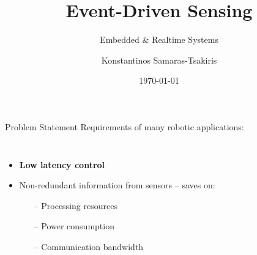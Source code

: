 \documentclass[11pt,center]{beamer}
\title{\huge{Event-Driven Sensing}}
\subtitle{Embedded \& Realtime Systems}
\author{Konstantinos Samaras-Tsakiris}
\date{\today}
\begin{document}
	\begin{frame}%
		\titlepage
	\end{frame}

	\begin{frame}{Problem Statement}
		Requirements of many robotic applications:
		\pause
		\begin{columns}
			\begin{itemize}
				\item<2-> \textbf{Low latency control}
				\item<4-> Non-redundant information from sensors -- saves on:
					\begin{itemize}
						\item[--] Processing resources
						\item[--] Power consumption
						\item[--] Communication bandwidth
					\end{itemize}
			\end{itemize}
		\end{columns}
	\end{frame}
\end{document}
